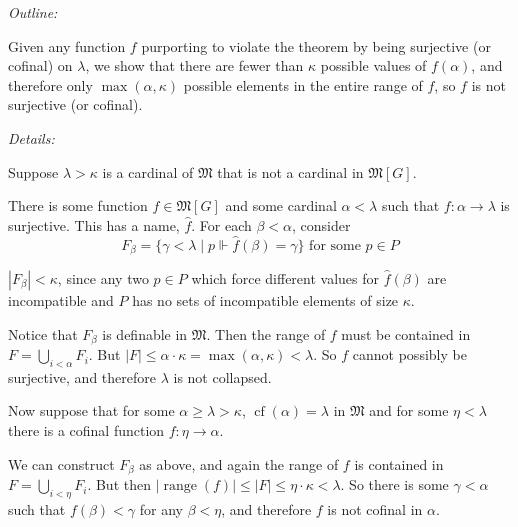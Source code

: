 \documentclass[12pt]{article}
\begin{document}
\emph{Outline:}

Given any function $f$ purporting to violate the theorem by being surjective (or cofinal) on $\lambda$, we show that there are fewer than $\kappa$ possible values of $f(\alpha)$, and therefore only $\max(\alpha,\kappa)$ possible elements in the entire range of $f$, so $f$ is not surjective (or cofinal).

\emph{Details:}

Suppose $\lambda>\kappa$ is a cardinal of $\mathfrak{M}$ that is not a cardinal in $\mathfrak{M}[G]$.  

There is some function $f\in\mathfrak{M}[G]$ and some cardinal $\alpha<\lambda$ such that $f:\alpha\rightarrow\lambda$ is surjective.  This has a name, $\hat{f}$.  For each $\beta<\alpha$, consider 
$$F_\beta=\{\gamma<\lambda\mid p\Vdash \hat{f}(\beta)=\gamma\}\text{ for some }p\in P$$

$|F_\beta|<\kappa$, since any two $p\in P$ which force different values for $\hat{f}(\beta)$ are incompatible and $P$ has no sets of incompatible elements of size $\kappa$.

Notice that $F_\beta$ is definable in $\mathfrak{M}$.  Then the range of $f$ must be contained in $F=\bigcup_{i<\alpha} F_i$.  But $|F|\leq\alpha\cdot\kappa=\max(\alpha,\kappa)<\lambda$.  So $f$ cannot possibly be surjective, and therefore $\lambda$ is not collapsed.

Now suppose that for some $\alpha\geq\lambda>\kappa$, $\operatorname{cf}(\alpha)=\lambda$ in $\mathfrak{M}$ and for some $\eta<\lambda$ there is a cofinal function $f:\eta\rightarrow\alpha$.

We can construct $F_\beta$ as above, and again the range of $f$ is contained in $F=\bigcup_{i<\eta} F_i$.  But then $|\operatorname{range}(f)|\leq|F|\leq\eta\cdot\kappa<\lambda$.  So there is some $\gamma<\alpha$ such that $f(\beta)<\gamma$ for any $\beta<\eta$, and therefore $f$ is not cofinal in $\alpha$.
\end{document}
